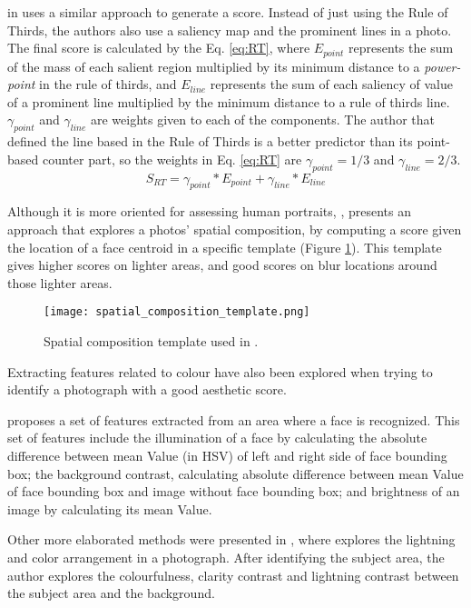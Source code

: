 \citeauthor{liu2010optimizing} in \cite{liu2010optimizing} uses a similar approach to generate a score. Instead of just using the Rule of Thirds, the authors also use a saliency map and the prominent lines in a photo. The final score is calculated by the Eq. \ref{eq:RT}, where $E_{point}$ represents the sum of the mass of each salient region multiplied by its minimum distance to a \emph{power-point} in the rule of thirds, and $E_{line}$ represents the sum of each saliency of value of a prominent line multiplied by the minimum distance to a rule of thirds line. $\gamma_{point}$ and $\gamma_{line}$ are weights given to each of the components. The author that defined the line based in the Rule of Thirds is a better predictor than its point-based counter part, so the weights in Eq. \ref{eq:RT} are $\gamma_{point} = 1/3$ and $\gamma_{line}=2/3$.
\begin{equation} \label{eq:RT}
	S_{RT} = \gamma_{point}*E_{point} + \gamma_ {line}*E_{line}
\end{equation}

Although it is more oriented for assessing human portraits, \citeauthor{khan2012evaluating} \cite{khan2012evaluating}, presents an approach that explores a photos' spatial composition, by computing a score given the location of a face centroid in a specific template (Figure \ref{fig:khan_template_image}). This template gives higher scores on lighter areas, and good scores on blur locations around those lighter areas.

\begin{figure}[htbp]
    \centering
    \texttt{[image: spatial\_composition\_template.png]}
	\caption{Spatial composition template used in \cite{khan2012evaluating}.}
	\label{fig:khan_template_image}
\end{figure}


Extracting features related to colour have also been explored when trying to identify a photograph with a good aesthetic score.

\citeauthor{khan2012evaluating} \cite{khan2012evaluating} proposes a set of features extracted from an area where a face is recognized. This set of features include the illumination of a face by calculating the absolute difference between mean Value (in HSV) of left and right side of face bounding box; the background contrast, calculating absolute difference between mean Value of face bounding box and image without face bounding box; and brightness of an image by calculating its mean Value.

Other more elaborated methods were presented in \cite{luo2011content}, where \citeauthor{luo2011content} explores the lightning and color arrangement in a photograph. After identifying the subject area, the author explores the colourfulness, clarity contrast and lightning contrast between the subject area and the background.




